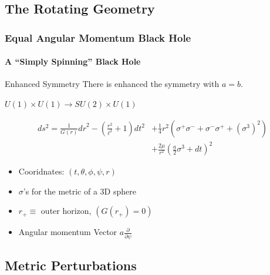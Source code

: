 \documentclass[xcolor=dvipsnames]{beamer}
\begin{document}
\subsection{The Rotating Geometry}

\begin{frame}[squeeze]
  \frametitle{Equal Angular Momentum Black Hole}
  \framesubtitle{A ``Simply Spinning'' Black Hole}

  \begin{block}{Enhanced Symmetry}
    There is enhanced the symmetry with $a=b$.
    \begin{center}$U(1)\times U(1) \longrightarrow SU(2)\times U(1)$ \end{center}
  \end{block}

  \begin{equation*}
    \begin{aligned}
      d s^2=\frac 1{G(r)}{dr}^2-\left(\frac{r^2}{\ell^2}+1\right)dt^2&+\frac 14 r^2 \left(\sigma^+ \sigma^- +\sigma^- \sigma^+ +(\sigma^3)^2\right) \\ &+\frac{2 \mu  }{r^2} \left(\frac a2 \sigma^3+dt\right)^2
    \end{aligned}
  \end{equation*}

  \begin{itemize}
    \item Cooridnates: $(t, \theta, \phi, \psi, r)$
    \item $\sigma$'s for the metric of a 3D sphere
    \item $r_+ \equiv$ outer horizon, $\left(G(r_+)=0\right)$
    \item Angular momentum Vector $a\frac\partial{\partial\psi}$
  \end{itemize}

\end{frame}

\subsection{Metric Perturbations}
\end{document}
